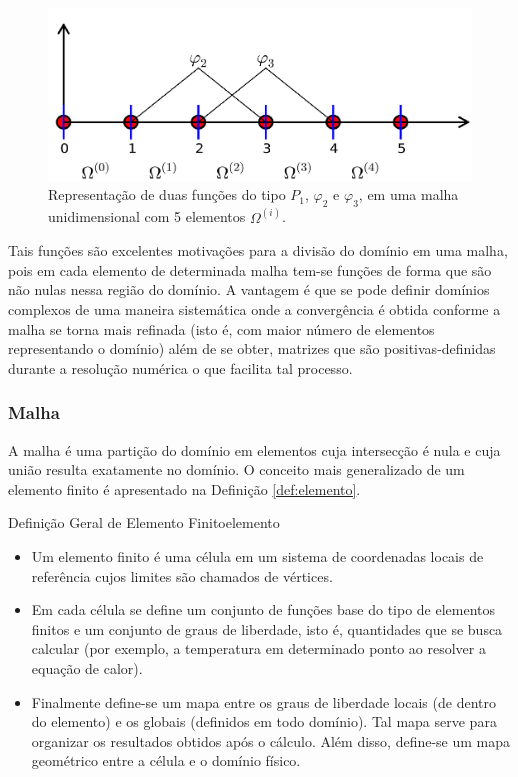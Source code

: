   \begin{figure}[ht]
	\centering
	\includegraphics[width=\linewidth]{./figures/P1_fun.pdf}
	\caption{Representação de duas funções do tipo $P_1$, $\varphi_2$ e
    $\varphi_3$, em uma malha unidimensional com 5 elementos $\Omega^{(i)} $.  \label{fig:P1fun}}
  \end{figure}

  Tais funções são excelentes motivações para a divisão do domínio em uma malha,
  pois em cada elemento de determinada malha tem-se funções de forma que são não
  nulas nessa região do domínio. A vantagem é que se pode definir domínios
  complexos de uma maneira sistemática onde a convergência é obtida conforme a
  malha se torna mais refinada (isto é, com maior número de elementos
  representando o domínio) além de se obter, matrizes que são
  positivas-definidas durante a resolução numérica o que facilita tal processo.

    \subsubsection{Malha}
    	A malha é uma partição do domínio em elementos cuja intersecção é nula e cuja união resulta exatamente no domínio. O conceito mais generalizado de um elemento finito é apresentado na Definição \ref{def:elemento}.

    \begin{Definition}{Definição Geral de Elemento Finito}{elemento}
      \begin{itemize}
        \item Um elemento finito é uma célula em um sistema de coordenadas
      locais de referência cujos limites são chamados de vértices.

        \item Em cada célula se define um conjunto de funções base do tipo de elementos
      finitos e um conjunto de graus de liberdade, isto é, quantidades que se
      busca calcular (por exemplo, a temperatura em determinado ponto ao resolver
      a equação de calor).
     
        \item Finalmente define-se um mapa entre os graus de liberdade locais (de dentro
      do elemento) e os globais (definidos em todo domínio). Tal mapa serve para
      organizar os resultados obtidos após o cálculo. Além disso, define-se um
      mapa geométrico entre a célula e o domínio físico.
      \end{itemize}
      \end{Definition}

